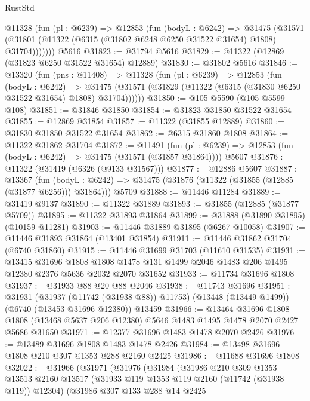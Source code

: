 \begin{lexlean}{RustStd}
\begin{coremodule}
      @11328
        (fun (pl : @6239) =>
        @12853
          (fun (bodyL : @6242) =>
          @31475
            (@31571 (@31801 (@11322 (@6315 (@31802 @6248 @6250 @31522 @31654) @1808) @31704)))))))
    @5616
@31823 := @31794 @5616
@31829 := @11322 (@12869 (@31823 @6250 @31522 @31654) @12889)
@31830 := @31802 @5616
@31846 := @13320
    (fun (pns : @11408) =>
    @11328
      (fun (pl : @6239) =>
      @12853
        (fun (bodyL : @6242) =>
        @31475 (@31571 (@31829 (@11322 (@6315 (@31830 @6250 @31522 @31654) @1808) @31704))))))
@31850 := @105 @5590 (@105 @5599 @108)
@31851 := @31846 @31850
@31854 := @31823 @31850 @31522 @31654
@31855 := @12869 @31854
@31857 := @11322 (@31855 @12889)
@31860 := @31830 @31850 @31522 @31654
@31862 := @6315 @31860 @1808
@31864 := @11322 @31862 @31704
@31872 := @11491
    (fun (pl : @6239) => @12853 (fun (bodyL : @6242) => @31475 (@31571 (@31857 @31864))))
    @5607
@31876 := @11322 (@31419 (@6326 (@9133 @31567)))
@31877 := @12886 @5607
@31887 := @13367
    (fun (bodyL : @6242) => @31475 (@31876 (@11322 (@31855 (@12885 (@31877 @6256))) @31864)))
    @5709
@31888 := @11446 @11284
@31889 := @31419 @9137
@31890 := @11322 @31889
@31893 := @31855 (@12885 (@31877 @5709))
@31895 := @11322 @31893 @31864
@31899 := @31888 (@31890 @31895) (@10159 @11281)
@31903 := @11446 @31889 @31895 (@6267 @10058)
@31907 := @11446 @31893 @31864 (@13401 @31854)
@31911 := @11446 @31862 @31704 (@6740 @31860)
@31915 := @11446 @31699 @31703 (@11610 @31535)
@31931 := @13415
    @31696
    @1808
    @1808
    @1478
    @131
    @1499
    @2046
    @1483
    @206
    @1495
    @12380
    @2376
    @5636
    @2032
    @2070
    @31652
@31933 := @11734 @31696 @1808
@31937 := @31933 @88 @20 @88 @2046
@31938 := @11743 @31696
@31951 := @31931
    (@31937 (@11742 (@31938 @88)) @11753)
    (@13448 (@13449 @1499))
    (@6740 (@13453 @31696 @12380))
    @13459
@31966 := @13464
    @31696
    @1808
    @1808
    (@13468 @5637 @206 @12380)
    @5646
    @1483
    @1495
    @1478
    @2070
    @2427
    @5686
    @31650
@31971 := @12377 @31696 @1483 @1478 @2070 @2426
@31976 := @13489 @31696 @1808 @1483 @1478 @2426
@31984 := @13498 @31696 @1808 @210 @307 @1353 @288 @2160 @2425
@31986 := @11688 @31696 @1808
@32022 := @31966
    (@31971
      (@31976
        (@31984
          (@31986
            @210
            @309
            @1353
            @13513
            @2160
            @13517
            (@31933 @119 @1353 @119 @2160 (@11742 (@31938 @119)) @12304)
            (@31986
              @307
              @133
              @288
              @14
              @2425

\end{coremodule}
\end{lexlean}
